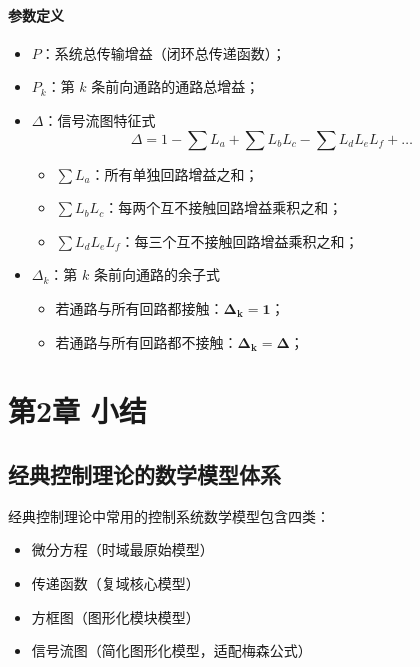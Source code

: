 \paragraph{参数定义}
\begin{itemize}
    \item $P$：系统总传输增益（闭环总传递函数）；
    \item $P_k$：第 $k$ 条前向通路的通路总增益；
    \item $\Delta$：信号流图特征式
    \[
    \Delta = 1 - \sum L_a + \sum L_b L_c - \sum L_d L_e L_f + \dots
    \]
    \begin{itemize}
        \item $\sum L_a$：所有单独回路增益之和；
        \item $\sum L_b L_c$：每两个互不接触回路增益乘积之和；
        \item $\sum L_d L_e L_f$：每三个互不接触回路增益乘积之和；
    \end{itemize}
    \item $\Delta_k$：第 $k$ 条前向通路的余子式
    \begin{itemize}
        \item 若通路与所有回路都接触：$\boldsymbol{\Delta_k=1}$；
        \item 若通路与所有回路都不接触：$\boldsymbol{\Delta_k=\Delta}$；
    \end{itemize}
\end{itemize}

\bigskip

\section{第2章 小结}
\subsection{经典控制理论的数学模型体系}
经典控制理论中常用的控制系统数学模型包含四类：
\begin{itemize}
    \item 微分方程（时域最原始模型）
    \item 传递函数（复域核心模型）
    \item 方框图（图形化模块模型）
    \item 信号流图（简化图形化模型，适配梅森公式）
\end{itemize}

